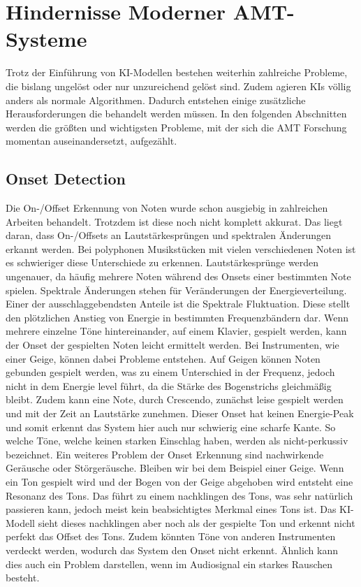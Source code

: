 \section{Hindernisse Moderner AMT-Systeme}
Trotz der Einführung von KI-Modellen bestehen weiterhin zahlreiche Probleme,
die bislang ungelöst oder nur unzureichend gelöst sind.
Zudem agieren KIs völlig anders als normale Algorithmen.
Dadurch entstehen einige zusätzliche Herausforderungen die behandelt werden müssen.
In den folgenden Abschnitten werden die größten und wichtigsten Probleme,
mit der sich die AMT Forschung momentan auseinandersetzt, aufgezählt.

\subsection{Onset Detection}\label{subsec:onset}
Die On-/Offset Erkennung von Noten wurde schon ausgiebig in zahlreichen Arbeiten behandelt.
Trotzdem ist diese noch nicht komplett akkurat.
Das liegt daran, dass On-/Offsets an Lautstärkesprüngen und spektralen Änderungen erkannt werden.
Bei polyphonen Musikstücken mit vielen verschiedenen Noten ist es schwieriger diese Unterschiede zu erkennen.
Lautstärkesprünge werden ungenauer, da häufig mehrere Noten während des Onsets einer bestimmten Note spielen.
Spektrale Änderungen stehen für Veränderungen der Energieverteilung.
Einer der ausschlaggebendsten Anteile ist die Spektrale Fluktuation.
Diese stellt den plötzlichen Anstieg von Energie in bestimmten Frequenzbändern dar.
Wenn mehrere einzelne Töne hintereinander, auf einem Klavier, gespielt werden, kann der Onset der gespielten Noten leicht ermittelt werden.
Bei Instrumenten, wie einer Geige, können dabei Probleme entstehen.
Auf Geigen können Noten gebunden gespielt werden, was zu einem Unterschied in der Frequenz,
jedoch nicht in dem Energie level führt, da die Stärke des Bogenstrichs gleichmäßig bleibt.
Zudem kann eine Note, durch Crescendo, zunächst leise gespielt werden und mit der Zeit an Lautstärke zunehmen.
Dieser Onset hat keinen Energie-Peak und somit erkennt das System hier auch nur schwierig eine scharfe Kante.
So welche Töne, welche keinen starken Einschlag haben, werden als nicht-perkussiv bezeichnet.
Ein weiteres Problem der Onset Erkennung sind nachwirkende Geräusche oder Störgeräusche.
Bleiben wir bei dem Beispiel einer Geige.
Wenn ein Ton gespielt wird und der Bogen von der Geige abgehoben wird entsteht eine Resonanz des Tons.
Das führt zu einem nachklingen des Tons, was sehr natürlich passieren kann,
jedoch meist kein beabsichtigtes Merkmal eines Tons ist.
Das KI-Modell sieht dieses nachklingen aber noch als der gespielte Ton und erkennt nicht perfekt das Offset des Tons.
Zudem könnten Töne von anderen Instrumenten verdeckt werden, wodurch das System den Onset nicht erkennt.
Ähnlich kann dies auch ein Problem darstellen, wenn im Audiosignal ein starkes Rauschen besteht.


